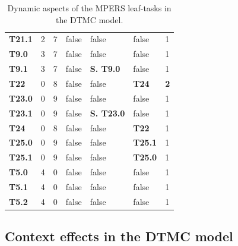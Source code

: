 \begin{table}
{\begin{tabularx}{\textwidth}{@{}lllllll@{}}
\textbf{T21.1}   & 2                & 7                  & false             & false                & false                & 1           \\
\textbf{T9.0}  & 3                  & 7                  & false             & false	        		& false                 & 1           \\
\textbf{T9.1}  & 3                  & 7                  & false             & \textbf{S. T9.0}     & false                 & 1           \\
\textbf{T22}   & 0                  & 8                  & false             & false                & \textbf{T24}                  & \textbf{2}  \\
\textbf{T23.0} & 0                  & 9                  & false             & false                & false                  & 1           \\
\textbf{T23.1} & 0                  & 9                  & false             & \textbf{S. T23.0}   & false                  & 1           \\
\textbf{T24}   & 0                  & 8                  & false             & false                & \textbf{T22}                  & 1           \\
\textbf{T25.0} & 0                  & 9                  & false             & false                & \textbf{T25.1                 } & 1           \\
\textbf{T25.1} & 0                  & 9                  & false             & false                & \textbf{T25.0}                  & 1           \\
\textbf{T5.0} & 4                   & 0                  & false             & false                & false                & 1           \\
\textbf{T5.1} & 4                   & 0                  & false             & false                & false                & 1           \\
\textbf{T5.2} & 4                   & 0                  & false             & false                & false                & 1           \\ \bottomrule
\end{tabularx}
\caption{Dynamic aspects of the MPERS leaf-tasks in the DTMC model.}
\label{tab:MPERS_DTMC_SLOTS}
}
\end{table}

\subsection{Context effects in the DTMC model}\label{ssec:ctx_effects_dtmc}

